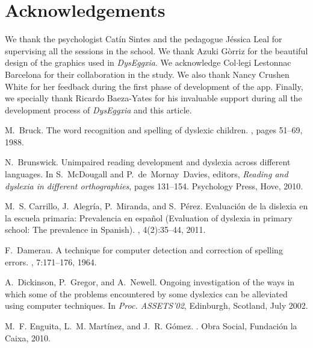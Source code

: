 \documentclass[letterpaper]{sig-alternate-2013}
\begin{document}
\section{Acknowledgements}
We thank the psychologist Cat\'in Sintes and the pedagogue J\'essica Leal for supervising all the sessions in the school.
We thank Azuki G\`orriz for the beautiful design of the graphics used in {\it DysEggxia}.  We acknowledge Col$\cdot$legi  Lestonnac Barcelona for their collaboration in the study. We also thank Nancy Crushen White for her feedback during the first phase of development of the app. Finally, we specially thank Ricardo Baeza-Yates for his invaluable support during all the development process of  {\it DysEggxia} and this article.


\begin{thebibliography}{10}

M.~Bruck.
\newblock The word recognition and spelling of dyslexic children.
, pages 51--69, 1988.

N.~Brunswick.
\newblock Unimpaired reading development and dyslexia across different
  languages.
\newblock In S.~McDougall and P.~de~Mornay~Davies, editors, {\em Reading and
  dyslexia in different orthographies}, pages 131--154. Psychology Press, Hove,
  2010.

M.~S. Carrillo, J.~Alegr\'ia, P.~Miranda, and S.~P\'erez.
\newblock Evaluaci\'on de la dislexia en la escuela primaria: Prevalencia en
  espa\~nol ({E}valuation of dyslexia in primary school: The prevalence in
  {S}panish).
, 4(2):35--44,
  2011.

F.~Damerau.
\newblock A technique for computer detection and correction of spelling errors.
, 7:171--176, 1964.

A.~Dickinson, P.~Gregor, and A.~Newell.
\newblock Ongoing investigation of the ways in which some of the problems
  encountered by some dyslexics can be alleviated using computer techniques.
\newblock In {\em Proc. ASSETS'02}, Edinburgh, Scotland, July 2002.

M.~F. Enguita, L.~M. Mart\'inez, and J.~R. G\'omez.
.
\newblock Obra Social, Fundaci\'on la Caixa, 2010.


\end{thebibliography}
\end{document}
